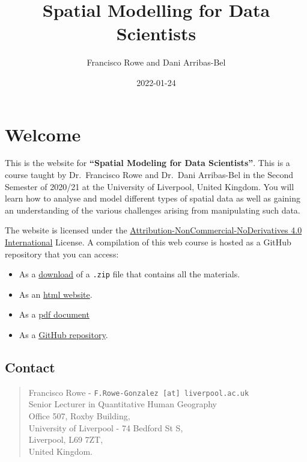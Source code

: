 \documentclass[
]{book}
\title{Spatial Modelling for Data Scientists}
\author{Francisco Rowe and Dani Arribas-Bel}
\date{2022-01-24}
\providecommand{\tightlist}{%
  \setlength{\itemsep}{0pt}\setlength{\parskip}{0pt}}
\begin{document}
\maketitle

{
\setcounter{tocdepth}{1}
\tableofcontents
}
\hypertarget{welcome}{%
\chapter*{Welcome}\label{welcome}}

This is the website for \textbf{``Spatial Modeling for Data Scientists''}. This is a course taught by Dr.~Francisco Rowe and Dr.~Dani Arribas-Bel in the Second Semester of 2020/21 at the University of Liverpool, United Kingdom. You will learn how to analyse and model different types of spatial data as well as gaining an understanding of the various challenges arising from manipulating such data.

The website is licensed under the \href{https://creativecommons.org/licenses/by-nc-nd/4.0/}{Attribution-NonCommercial-NoDerivatives 4.0 International} License. A compilation of this web course is hosted as a GitHub repository that you can access:

\begin{itemize}
\tightlist
\item
  As a \href{https://github.com/GDSL-UL/san/archive/master.zip}{download} of a \texttt{.zip} file that contains all the materials.
\item
  As an \href{https://gdsl-ul.github.io/san/}{html website}.
\item
  As a \href{https://gdsl-ul.github.io/san/spatial_analysis_notes.pdf}{pdf document}
\item
  As a \href{https://github.com/GDSL-UL/san}{GitHub repository}.
\end{itemize}

\hypertarget{contact}{%
\section*{Contact}\label{contact}}

\begin{quote}
Francisco Rowe - \texttt{F.Rowe-Gonzalez\ {[}at{]}\ liverpool.ac.uk}\\
Senior Lecturer in Quantitative Human Geography\\
Office 507, Roxby Building,\\
University of Liverpool - 74 Bedford St S,\\
Liverpool, L69 7ZT,\\
United Kingdom.
\end{quote}
\end{document}
